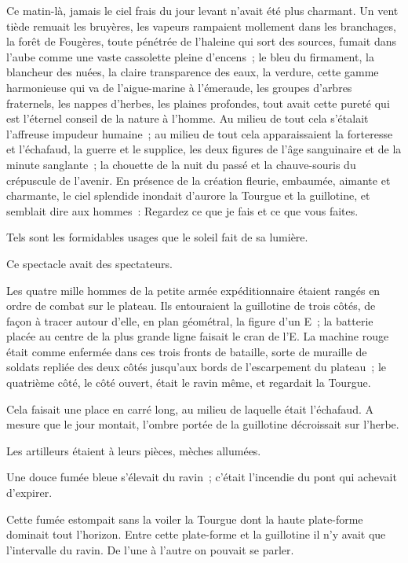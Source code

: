 \documentclass[french,twoside]{book} %
\begin{document}
Ce matin-là, jamais le ciel frais du jour levant n’avait été plus charmant. Un vent tiède remuait les bruyères, les vapeurs rampaient mollement dans les branchages, la forêt de Fougères, toute pénétrée de l’haleine qui sort des sources, fumait dans l’aube comme une vaste cassolette pleine d’encens ; le bleu du firmament, la blancheur des nuées, la claire transparence des eaux, la verdure, cette gamme harmonieuse qui va de l’aigue-marine à l’émeraude, les groupes d’arbres fraternels, les nappes d’herbes, les plaines profondes, tout avait cette pureté qui est l’éternel conseil de la nature à l’homme. Au milieu de tout cela s’étalait l’affreuse impudeur humaine ; au milieu de tout cela apparaissaient la forteresse et l’échafaud, la guerre et le supplice, les deux figures de l’âge sanguinaire et de la minute sanglante ; la chouette de la nuit du passé et la chauve-souris du crépuscule de l’avenir. En présence de la création fleurie, embaumée, aimante et charmante, le ciel splendide inondait d’aurore la Tourgue et la guillotine, et semblait dire aux hommes : Regardez ce que je fais et ce que vous faites.\par
Tels sont les formidables usages que le soleil fait de sa lumière.\par
Ce spectacle avait des spectateurs.\par
Les quatre mille hommes de la petite armée expéditionnaire étaient rangés en ordre de combat sur le plateau. Ils entouraient la guillotine de trois côtés, de  façon à tracer autour d’elle, en plan géométral, la figure d’un E ; la batterie placée au centre de la plus grande ligne faisait le cran de l’E. La machine rouge était comme enfermée dans ces trois fronts de bataille, sorte de muraille de soldats repliée des deux côtés jusqu’aux bords de l’escarpement du plateau ; le quatrième côté, le côté ouvert, était le ravin même, et regardait la Tourgue.\par
Cela faisait une place en carré long, au milieu de laquelle était l’échafaud. A mesure que le jour montait, l’ombre portée de la guillotine décroissait sur l’herbe.\par
Les artilleurs étaient à leurs pièces, mèches allumées.\par
Une douce fumée bleue s’élevait du ravin ; c’était l’incendie du pont qui achevait d’expirer.\par
Cette fumée estompait sans la voiler la Tourgue dont la haute plate-forme dominait tout l’horizon. Entre cette plate-forme et la guillotine il n’y avait que l’intervalle du ravin. De l’une à l’autre on pouvait se parler.\par
\end{document}
